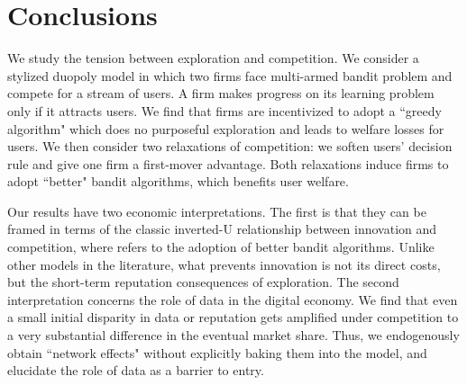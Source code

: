 \documentclass[../competing_bandits.tex]{subfiles}
\begin{document}
\section{Conclusions}\label{sec:conclusion}

We study the tension between exploration and competition. We consider a stylized duopoly model in which two firms face  multi-armed bandit problem and compete for a stream of users. A firm makes progress on its learning problem only if it attracts users.
We find that firms are incentivized to adopt a ``greedy algorithm" which does no purposeful exploration and leads to welfare losses for users. We then consider two relaxations of competition: we soften users' decision rule and give one firm a first-mover advantage. Both relaxations induce firms to adopt ``better" bandit algorithms, which benefits user welfare.


Our results have two economic interpretations. The first is that they can be framed in terms of the classic inverted-U relationship between innovation and competition, where \innovation refers to the adoption of better bandit algorithms. Unlike other models in the literature, what prevents innovation is not its direct costs, but the short-term reputation consequences of exploration. The second interpretation concerns the role of data in the digital economy. We find that even a small initial disparity in data or reputation gets amplified under competition to a very substantial difference in the eventual market share. Thus, we endogenously obtain ``network effects" without explicitly baking them into the model, and elucidate the role of data as a barrier to entry.
\end{document}
